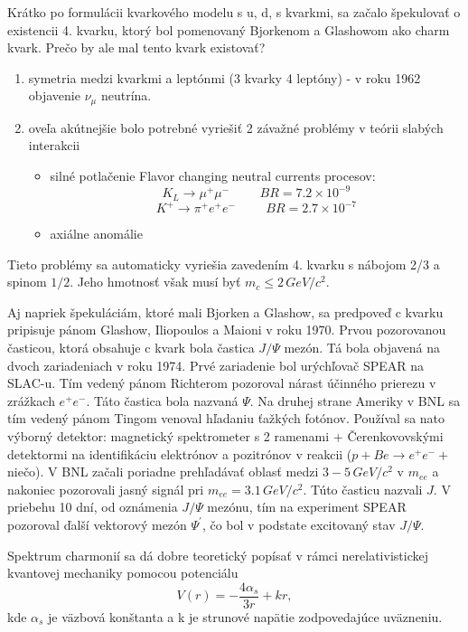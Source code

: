 \documentclass[../../main.tex]{subfiles}
\begin{document}
Krátko po formulácii kvarkového modelu s u, d, s kvarkmi, sa začalo špekulovať o existencii 4. kvarku, ktorý bol pomenovaný Bjorkenom a Glashowom ako charm kvark. Prečo by ale mal tento kvark existovať?
\begin{enumerate}
\item symetria medzi kvarkmi a leptónmi (3 kvarky 4 leptóny) - v roku 1962 objavenie $\nu_{\mu}$ neutrína.
\item oveľa akútnejšie bolo potrebné vyriešiť 2 závažné problémy v teórii slabých interakcii
\begin{itemize}
\item silné potlačenie Flavor changing neutral currents procesov:
$$ K_L \rightarrow \mu^+ \mu^- \hspace{1cm} BR = 7.2\times 10^{-9} $$
$$ K^+ \rightarrow \pi^+ e^+ e^- \hspace{1cm} BR = 2.7\times 10^{-7} $$
\item axiálne anomálie
\end{itemize}
\end{enumerate}
Tieto problémy sa automaticky vyriešia zavedením 4. kvarku s nábojom 2/3 a spinom $ 1/2$. Jeho hmotnosť však musí byť $ m_c \leq 2\,GeV/c^2 $.

Aj napriek špekuláciám, ktoré mali Bjorken a Glashow, sa predpoveď c kvarku pripisuje pánom Glashow, Iliopoulos a Maioni v roku 1970. Prvou pozorovanou časticou, ktorá obsahuje c kvark bola častica $J/\Psi$ mezón. Tá bola objavená na dvoch zariadeniach v roku 1974. Prvé zariadenie bol urýchľovač SPEAR na SLAC-u. Tím vedený pánom Richterom pozoroval nárast účinného prierezu v zrážkach $e^+e^-$. Táto častica bola nazvaná $\Psi$. Na druhej strane Ameriky v BNL sa tím vedený pánom Tingom venoval hľadaniu ťažkých fotónov. Používal sa nato výborný detektor: magnetický spektrometer s 2 ramenami + Čerenkovovskými detektormi na identifikáciu elektrónov a pozitrónov v reakcii ($p+Be \rightarrow e^+e^- + $niečo). V BNL začali poriadne prehľadávať oblasť medzi $3-5\,GeV/c^2$ v $m_{ee}$ a nakoniec pozorovali jasný signál pri $m_{ee}=3.1\,GeV/c^2$. Túto časticu nazvali $J$. V priebehu 10 dní, od oznámenia $J/\Psi$ mezónu, tím na experiment SPEAR pozoroval ďalší vektorový mezón $\Psi^{\prime}$, čo bol v podstate excitovaný stav $J/\Psi$.

Spektrum charmonií sa dá dobre teoretický popísať v rámci nerelativistickej kvantovej mechaniky pomocou potenciálu 
$$ V(r)=-\frac{4\alpha_s}{3r}+kr,$$ 
kde $\alpha_s$ je väzbová konštanta a k je strunové napätie zodpovedajúce uväzneniu.
\end{document}
